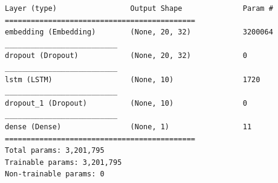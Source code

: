 \begin{lstlisting}[label=lst:lstm, caption={Summary of our LSTM network. We use an embedding layer of size 32, 10 LSTM cells, a dropout layer before and after the LSTM layer with a defaut dropout ratio of 0.2 and a dense mapping to a single output neuron for binary classifcation with a threshold of 0.5.}]
Layer (type)                 Output Shape              Param #
============================================
embedding (Embedding)        (None, 20, 32)            3200064
__________________________
dropout (Dropout)            (None, 20, 32)            0
__________________________
lstm (LSTM)                  (None, 10)                1720
__________________________
dropout_1 (Dropout)          (None, 10)                0
__________________________
dense (Dense)                (None, 1)                 11
============================================
Total params: 3,201,795
Trainable params: 3,201,795
Non-trainable params: 0\end{lstlisting}